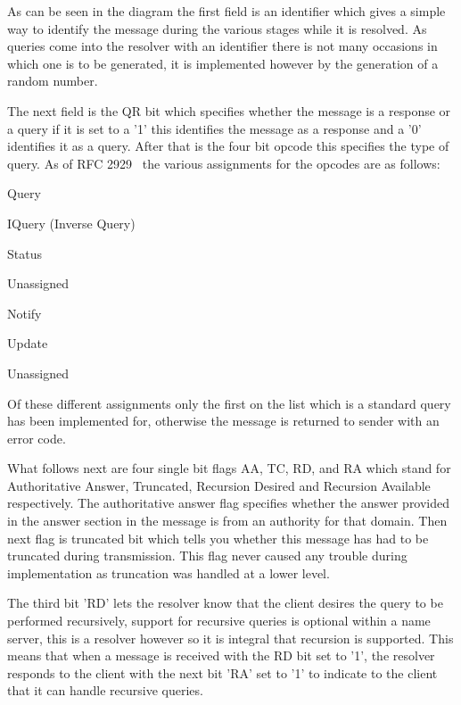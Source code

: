 \documentclass{l3proj}
\begin{document}
As can be seen in the diagram the first field is an identifier which gives a simple way to identify the message during the various stages while it is resolved. As queries come into the resolver with an identifier there is not many occasions in which one is to be generated, it is implemented however by the generation of a random number.

The next field is the QR bit which specifies whether the message is a response or a query if it is set to a '1' this identifies the message as a response and a '0' identifies it as a query. After that is the four bit opcode this specifies the type of query. As of RFC 2929~\cite{rfc2929} the various assignments for the opcodes are as follows:

\begin{description}[noitemsep]
  \item[0] Query
  \item[1] IQuery (Inverse Query)
  \item[2] Status
  \item[3] Unassigned
  \item[4] Notify
  \item[5] Update
  \item[6-15] Unassigned
\end{description}

Of these different assignments only the first on the list which is a standard query has been implemented for, otherwise the message is returned to sender with an error code.

What follows next are four single bit flags AA, TC, RD, and RA which stand for Authoritative Answer, Truncated, Recursion Desired and Recursion Available respectively. The authoritative answer flag specifies whether the answer provided in the answer section in the message is from an authority for that domain. Then next flag is truncated bit which tells you whether this message has had to be truncated during transmission. This flag never caused any trouble during implementation as truncation was handled at a lower level.

The third bit 'RD' lets the resolver know that the client desires the query to be performed recursively, support for recursive queries is optional within a name server, this is a resolver however so it is integral that recursion is supported. This means that when a message is received with the RD bit set to '1', the resolver responds to the client with the next bit 'RA' set to '1' to indicate to the client that it can handle recursive queries.
\end{document}
